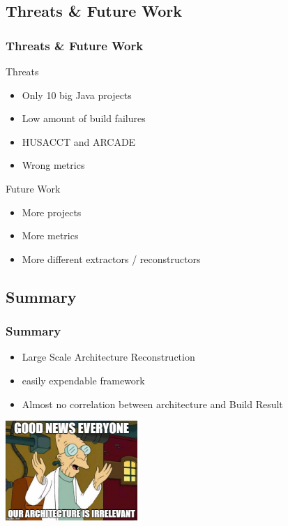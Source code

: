 \documentclass{beamer}
\begin{document}
\subsection{Threats \& Future Work}
\begin{frame}
\frametitle{Threats \& Future Work}

Threats
\begin{itemize}
	\item Only 10 big Java projects
	\item Low amount of build failures
	\item HUSACCT and ARCADE
	\item Wrong metrics
\end{itemize}
\vspace{0.25cm}
\pause

Future Work
\begin{itemize}
	\item More projects
	\item More metrics
	\item More different extractors / reconstructors
\end{itemize}

\end{frame}

\subsection{Summary}
\begin{frame}
\frametitle{Summary}

\begin{itemize}
	\item Large Scale Architecture Reconstruction
	\item easily expendable framework
	\item Almost no correlation between architecture and Build Result
\end{itemize}
\pause
\begin{center}
	\includegraphics[width=5cm]{assets/professor.jpg}
\end{center}

\end{frame}
 
\end{document}
